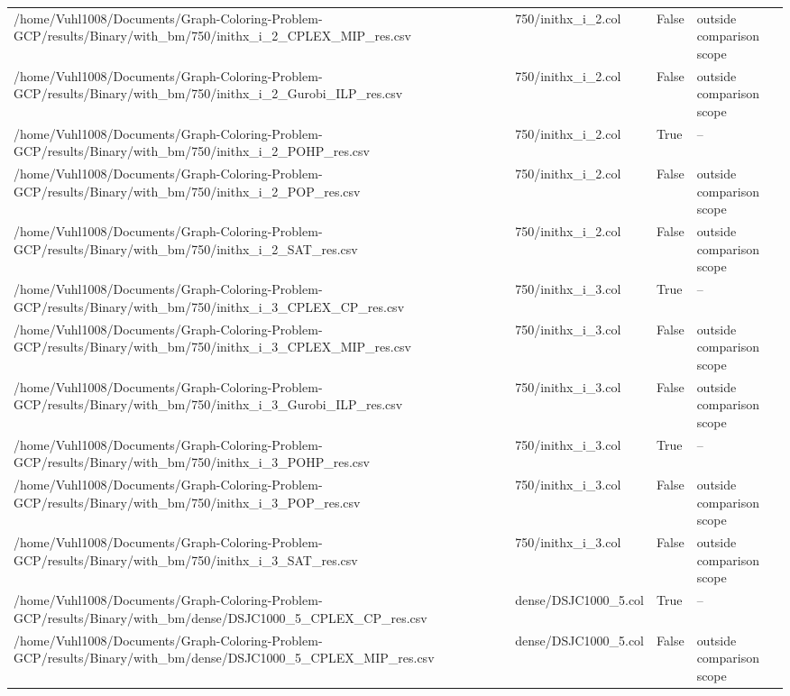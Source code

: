 \begin{table}[htbp]
\begin{tabular}{llll}
/home/Vuhl1008/Documents/Graph-Coloring-Problem-GCP/results/Binary/with\_bm/750/inithx\_i\_2\_CPLEX\_MIP\_res.csv & 750/inithx\_i\_2.col & False & outside comparison scope \\
/home/Vuhl1008/Documents/Graph-Coloring-Problem-GCP/results/Binary/with\_bm/750/inithx\_i\_2\_Gurobi\_ILP\_res.csv & 750/inithx\_i\_2.col & False & outside comparison scope \\
/home/Vuhl1008/Documents/Graph-Coloring-Problem-GCP/results/Binary/with\_bm/750/inithx\_i\_2\_POHP\_res.csv & 750/inithx\_i\_2.col & True & -- \\
/home/Vuhl1008/Documents/Graph-Coloring-Problem-GCP/results/Binary/with\_bm/750/inithx\_i\_2\_POP\_res.csv & 750/inithx\_i\_2.col & False & outside comparison scope \\
/home/Vuhl1008/Documents/Graph-Coloring-Problem-GCP/results/Binary/with\_bm/750/inithx\_i\_2\_SAT\_res.csv & 750/inithx\_i\_2.col & False & outside comparison scope \\
/home/Vuhl1008/Documents/Graph-Coloring-Problem-GCP/results/Binary/with\_bm/750/inithx\_i\_3\_CPLEX\_CP\_res.csv & 750/inithx\_i\_3.col & True & -- \\
/home/Vuhl1008/Documents/Graph-Coloring-Problem-GCP/results/Binary/with\_bm/750/inithx\_i\_3\_CPLEX\_MIP\_res.csv & 750/inithx\_i\_3.col & False & outside comparison scope \\
/home/Vuhl1008/Documents/Graph-Coloring-Problem-GCP/results/Binary/with\_bm/750/inithx\_i\_3\_Gurobi\_ILP\_res.csv & 750/inithx\_i\_3.col & False & outside comparison scope \\
/home/Vuhl1008/Documents/Graph-Coloring-Problem-GCP/results/Binary/with\_bm/750/inithx\_i\_3\_POHP\_res.csv & 750/inithx\_i\_3.col & True & -- \\
/home/Vuhl1008/Documents/Graph-Coloring-Problem-GCP/results/Binary/with\_bm/750/inithx\_i\_3\_POP\_res.csv & 750/inithx\_i\_3.col & False & outside comparison scope \\
/home/Vuhl1008/Documents/Graph-Coloring-Problem-GCP/results/Binary/with\_bm/750/inithx\_i\_3\_SAT\_res.csv & 750/inithx\_i\_3.col & False & outside comparison scope \\
/home/Vuhl1008/Documents/Graph-Coloring-Problem-GCP/results/Binary/with\_bm/dense/DSJC1000\_5\_CPLEX\_CP\_res.csv & dense/DSJC1000\_5.col & True & -- \\
/home/Vuhl1008/Documents/Graph-Coloring-Problem-GCP/results/Binary/with\_bm/dense/DSJC1000\_5\_CPLEX\_MIP\_res.csv & dense/DSJC1000\_5.col & False & outside comparison scope \\

\end{tabular}
\end{table}
